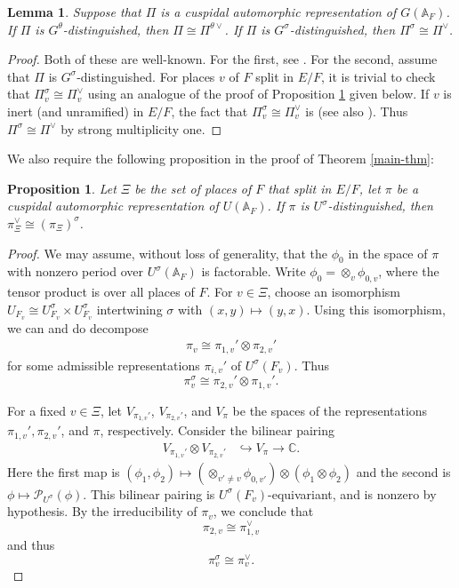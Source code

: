 \documentclass[12pt]{amsart}
\newtheorem{lem}[thm]{Lemma}
\newtheorem{prop}[thm]{Proposition}
\theoremstyle{remark}
\numberwithin{equation}{section}
\newcommand{\A}{\mathbb{A}}
\newcommand{\lto}{\longrightarrow}
\newcommand{\CC}{\mathbb{C}}
\theoremstyle{definition}
\numberwithin{equation}{subsection}
\begin{document}
\begin{lem} \label{lem-2nd-stab} Suppose that $\Pi$ is a cuspidal automorphic representation of $G(\A_F)$.
 If $\Pi$ is $G^{\theta}$-distinguished, then $\Pi \cong \Pi^{\theta\vee}$.  If $\Pi$ is $G^{\sigma}$-distinguished,
 then $\Pi^{\sigma} \cong \Pi^{\vee}$.
\end{lem}

\begin{proof} Both of these are well-known.  For the first, see \cite[\S 3]{JacquetKlII}.  For the second, assume that $\Pi$ is $G^{\sigma}$-distinguished.  For places $v$ of $F$ split in $E/F$, it is trivial to check that $\Pi^{\sigma}_v \cong \Pi^{\vee}_v$ using an analogue of the proof of Proposition \ref{prop-first-stab} given below.  If $v$ is inert (and unramified) in $E/F$, the fact that $\Pi^{\sigma}_v \cong \Pi^{\vee}_v$ is \cite[Corollary 2]{Prasad} (see also \cite{FlickerDist}).  Thus $\Pi^{\sigma} \cong \Pi^{\vee}$ by strong multiplicity one.
\end{proof}

We also require the following proposition in the proof of Theorem \ref{main-thm}:

\begin{prop} \label{prop-first-stab} Let $\Xi$ be the set of places of $F$ that split in $E/F$,
let $\pi$ be a cuspidal automorphic representation of $U(\A_F)$.  If $\pi$ is $U^{\sigma}$-distinguished, then
$\pi_{\Xi}^{\vee} \cong (\pi_{\Xi})^{\sigma}$.
\end{prop}

\begin{proof}
We may assume, without loss of generality, that the $\phi_0$ in the space of $\pi$ with nonzero period over $U^{\sigma}(\A_F)$ is
factorable.  Write $\phi_0=\otimes_v \phi_{0,v}$, where the tensor
product is over all places of $F$.  For  $v \in \Xi$, choose an isomorphism $U_{F_v} \cong U^{\sigma}_{F_v} \times U^{\sigma}_{F_v}$ intertwining $\sigma$ with $(x,y) \mapsto (y,x)$.  Using this isomorphism, we can and do decompose
\begin{align} \label{loc-isom5}
\pi_v \cong \pi_{1,v}' \otimes \pi_{2,v}'
\end{align}
for some admissible representations $\pi_{i,v}'$ of $U^{\sigma}(F_v)$.
Thus
$$
\pi_v^{\sigma} \cong \pi_{2,v}' \otimes \pi_{1,v}'.
$$


For
a fixed $v \in \Xi$, let $V_{\pi_{1,v}'}$, $V_{\pi_{2,v}'}$, and
$V_{\pi}$ be the spaces of the representations $\pi_{1,v}',\pi_{2,v}'$, and $\pi$, respectively. Consider the bilinear pairing
\begin{align*}
V_{\pi_{1,v}'} \otimes V_{\pi_{2,v}'} &\hookrightarrow V_{\pi} \lto
\CC.
\end{align*}
Here the first map is $(\phi_1,\phi_2) \mapsto (\otimes_{v' \neq v}
\phi_{0,v'})\otimes (\phi_1 \otimes \phi_2)$ and the second is $\phi \mapsto \mathcal{P}_{U^{\sigma}}(\phi)$.
This bilinear pairing is $U^{\sigma}(F_v)$-equivariant, and is nonzero by
hypothesis.    By the irreducibility of $\pi_v$, we conclude that
$$
\pi_{2,v} \cong \pi_{1,v}^{\vee}
$$
and thus
$$
\pi_v^{\sigma} \cong \pi_v^{\vee}.
$$
\end{proof}
\end{document}
